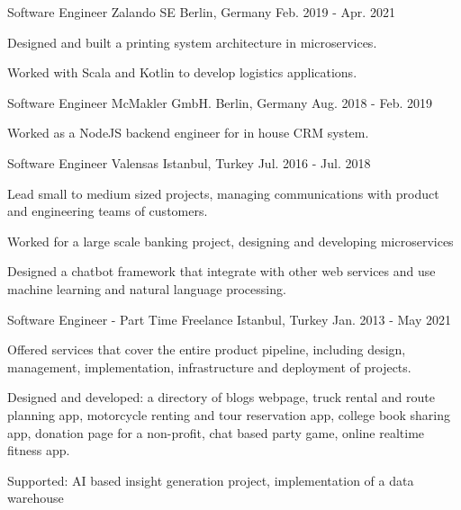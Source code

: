 \begin{cventries}
  \cventry
    {Software Engineer}
    {Zalando SE}
    {Berlin, Germany}
    {Feb. 2019 - Apr. 2021}
    {
      \begin{cvitems}
        \item {Designed and built a printing system architecture in microservices.}
        \item {Worked with Scala and Kotlin to develop logistics applications.}
      \end{cvitems}
    }


  \cventry
    {Software Engineer}
    {McMakler GmbH.}
    {Berlin, Germany}
    {Aug. 2018 - Feb. 2019}
    {
      \begin{cvitems}
        \item {Worked as a NodeJS backend engineer for in house CRM system.}
      \end{cvitems}
    }

  \cventry
    {Software Engineer}
    {Valensas}
    {Istanbul, Turkey}
    {Jul. 2016 - Jul. 2018}
    {
      \begin{cvitems}
        \item {Lead small to medium sized projects, managing communications with product and engineering teams of customers.}
        \item {Worked for a large scale banking project, designing and developing microservices}
        \item {Designed a chatbot framework that integrate with other web services and use machine learning and natural language processing.}
      \end{cvitems}
    }

  \cventry
    {Software Engineer - Part Time}
    {Freelance}
    {Istanbul, Turkey}
    {Jan. 2013 - May 2021}
    {
      \begin{cvitems}
        \item {Offered services that cover the entire product pipeline, including design, management, implementation, infrastructure and deployment of projects.}
        \item {Designed and developed: a directory of blogs webpage, truck rental and route planning app, motorcycle renting and tour reservation app, college book sharing app, donation page for a non-profit, chat based party game, online realtime fitness app.}
        \item {Supported: AI based insight generation project, implementation of a data warehouse}
      \end{cvitems}
    }    
    

\end{cventries}
